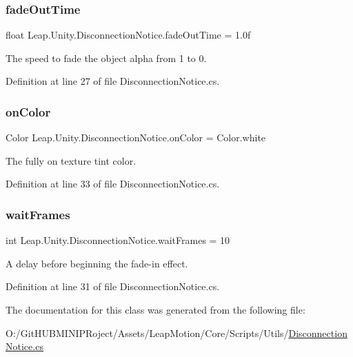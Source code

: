 \subsubsection{\texorpdfstring{fadeOutTime}{fadeOutTime}}
{\footnotesize\ttfamily float Leap.\+Unity.\+Disconnection\+Notice.\+fade\+Out\+Time = 1.\+0f}

The speed to fade the object alpha from 1 to 0. 

Definition at line 27 of file Disconnection\+Notice.\+cs.

\mbox{\label{class_leap_1_1_unity_1_1_disconnection_notice_ab781e52e1da2bc11e38831950e74a619}} 
\subsubsection{\texorpdfstring{onColor}{onColor}}
{\footnotesize\ttfamily Color Leap.\+Unity.\+Disconnection\+Notice.\+on\+Color = Color.\+white}

The fully on texture tint color. 

Definition at line 33 of file Disconnection\+Notice.\+cs.

\mbox{\label{class_leap_1_1_unity_1_1_disconnection_notice_a31b87b2e3c6dde73afd348419356e8d4}} 
\subsubsection{\texorpdfstring{waitFrames}{waitFrames}}
{\footnotesize\ttfamily int Leap.\+Unity.\+Disconnection\+Notice.\+wait\+Frames = 10}

A delay before beginning the fade-\/in effect. 

Definition at line 31 of file Disconnection\+Notice.\+cs.



The documentation for this class was generated from the following file\+:\begin{DoxyCompactItemize}
\item 
O\+:/\+Git\+H\+U\+B\+M\+I\+N\+I\+P\+Roject/\+Assets/\+Leap\+Motion/\+Core/\+Scripts/\+Utils/\mbox{\hyperlink{_disconnection_notice_8cs}{Disconnection\+Notice.\+cs}}\end{DoxyCompactItemize}
